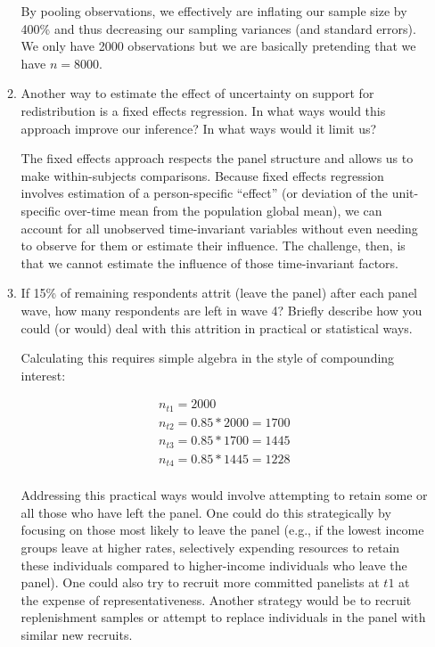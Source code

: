 \documentclass[a4paper]{exam}
\begin{document}
\begin{enumerate}
\begin{enumerate}
  \begin{solution}
  
  By pooling observations, we effectively are inflating our sample size by 400\% and thus decreasing our sampling variances (and standard errors). We only have 2000 observations but we are basically pretending that we have $n=8000$.
  
  \end{solution}
  
  \item Another way to estimate the effect of uncertainty on support for redistribution is a fixed effects regression. In what ways would this approach improve our inference? In what ways would it limit us?
  
  \begin{solution}
  
  The fixed effects approach respects the panel structure and allows us to make within-subjects comparisons. Because fixed effects regression involves estimation of a person-specific ``effect'' (or deviation of the unit-specific over-time mean from the population global mean), we can account for all unobserved time-invariant variables without even needing to observe for them or estimate their influence. The challenge, then, is that we cannot estimate the influence of those time-invariant factors.
  
  \end{solution}
  
  \item If 15\% of remaining respondents attrit (leave the panel) after each panel wave, how many respondents are left in wave 4? Briefly describe how you could (or would) deal with this attrition in practical or statistical ways.
  
  \begin{solution}
  
  Calculating this requires simple algebra in the style of compounding interest:
  
  \begin{align}
  n_{t1} = 2000\\
  n_{t2} = 0.85 * 2000 = 1700\\
  n_{t3} = 0.85 * 1700 = 1445\\
  n_{t4} = 0.85 * 1445 = 1228\\
  \end{align}
  
  Addressing this practical ways would involve attempting to retain some or all those who have left the panel. One could do this strategically by focusing on those most likely to leave the panel (e.g., if the lowest income groups leave at higher rates, selectively expending resources to retain these individuals compared to higher-income individuals who leave the panel). One could also try to recruit more committed panelists at $t1$ at the expense of representativeness. Another strategy would be to recruit replenishment samples or attempt to replace individuals in the panel with similar new recruits.
  

\end{solution}
\end{enumerate}
\end{enumerate}
\end{document}
